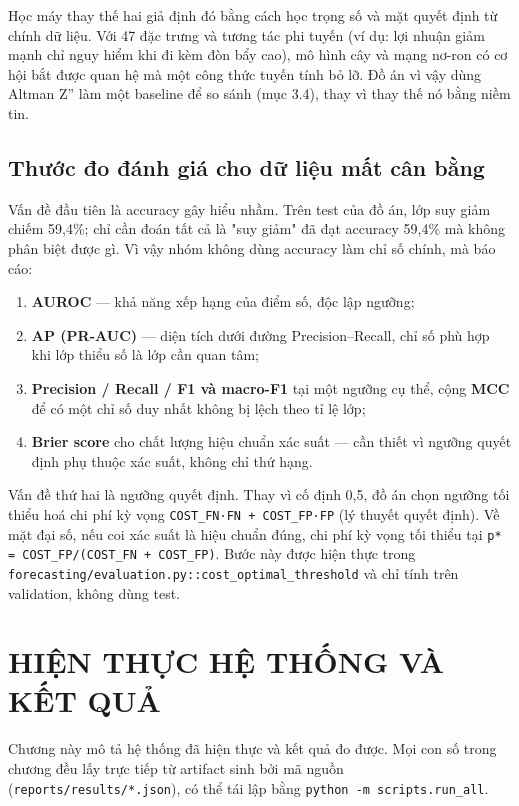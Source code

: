 \documentclass[13pt,a4paper]{extreport}
\begin{document}
Học máy thay thế hai giả định đó bằng cách học trọng số và mặt quyết định từ chính dữ liệu. Với 47 đặc trưng và tương tác phi tuyến (ví dụ: lợi nhuận giảm mạnh chỉ nguy hiểm khi đi kèm đòn bẩy cao), mô hình cây và mạng nơ-ron có cơ hội bắt được quan hệ mà một công thức tuyến tính bỏ lỡ. Đồ án vì vậy dùng Altman Z'' làm một baseline để so sánh (mục 3.4), thay vì thay thế nó bằng niềm tin.

\section{Thước đo đánh giá cho dữ liệu mất cân bằng}

Vấn đề đầu tiên là accuracy gây hiểu nhầm. Trên test của đồ án, lớp suy giảm chiếm 59,4\%; chỉ cần đoán tất cả là "suy giảm" đã đạt accuracy 59,4\% mà không phân biệt được gì. Vì vậy nhóm không dùng accuracy làm chỉ số chính, mà báo cáo:

\begin{enumerate}
\item \textbf{AUROC} — khả năng xếp hạng của điểm số, độc lập ngưỡng;
\item \textbf{AP (PR-AUC)} — diện tích dưới đường Precision–Recall, chỉ số phù hợp khi lớp thiểu số là lớp cần quan tâm;
\item \textbf{Precision / Recall / F1 và macro-F1} tại một ngưỡng cụ thể, cộng \textbf{MCC} để có một chỉ số duy nhất không bị lệch theo tỉ lệ lớp;
\item \textbf{Brier score} cho chất lượng hiệu chuẩn xác suất — cần thiết vì ngưỡng quyết định phụ thuộc xác suất, không chỉ thứ hạng.
\end{enumerate}

Vấn đề thứ hai là ngưỡng quyết định. Thay vì cố định 0,5, đồ án chọn ngưỡng tối thiểu hoá chi phí kỳ vọng \texttt{COST\_FN·FN + COST\_FP·FP} (lý thuyết quyết định). Về mặt đại số, nếu coi xác suất là hiệu chuẩn đúng, chi phí kỳ vọng tối thiểu tại \texttt{p* = COST\_FP/(COST\_FN + COST\_FP)}. Bước này được hiện thực trong \texttt{forecasting/evaluation.py::cost\_optimal\_threshold} và chỉ tính trên validation, không dùng test.

\clearpage

\chapter{HIỆN THỰC HỆ THỐNG VÀ KẾT QUẢ}

Chương này mô tả hệ thống đã hiện thực và kết quả đo được. Mọi con số trong chương đều lấy trực tiếp từ artifact sinh bởi mã nguồn (\texttt{reports/results/*.json}), có thể tái lập bằng \texttt{python -m scripts.run\_all}.
\end{document}
